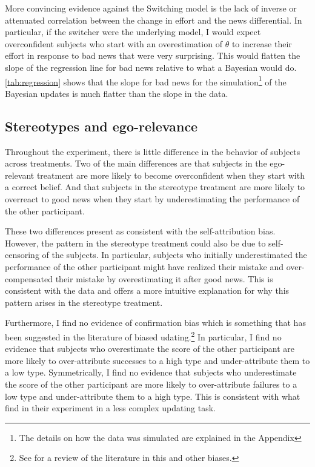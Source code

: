 \documentclass[
  12pt,
]{article}
\begin{document}
More convincing evidence against the Switching model is the lack of
inverse or attenuated correlation between the change in effort and the
news differential. In particular, if the switcher were the underlying
model, I would expect overconfident subjects who start with an
overestimation of \(\theta\) to increase their effort in response to bad
news that were very surprising. This would flatten the slope of the
regression line for bad news relative to what a Bayesian would do.
\ref{tab:regression} shows that the slope for bad news for the
simulation\footnote{The details on how the data was simulated are explained in the Appendix}
of the Bayesian updates is much flatter than the slope in the data.

\hypertarget{stereotypes-and-ego-relevance}{%
\subsection{Stereotypes and
ego-relevance}\label{stereotypes-and-ego-relevance}}

Throughout the experiment, there is little difference in the behavior of
subjects across treatments. Two of the main differences are that
subjects in the ego-relevant treatment are more likely to become
overconfident when they start with a correct belief. And that subjects
in the stereotype treatment are more likely to overreact to good news
when they start by underestimating the performance of the other
participant.

These two differences present as consistent with the self-attribution
bias. However, the pattern in the stereotype treatment could also be due
to self-censoring of the subjects. In particular, subjects who initially
underestimated the performance of the other participant might have
realized their mistake and over-compensated their mistake by
overestimating it after good news. This is consistent with the data and
offers a more intuitive explanation for why this pattern arises in the
stereotype treatment.

Furthermore, I find no evidence of confirmation bias which is something
that has been suggested in the literature of biased
udating.\footnote{See \citet{benjamin2019} for a review of the literature in this and 
other biases.} In particular, I find no evidence that subjects who
overestimate the score of the other participant are more likely to
over-attribute successes to a high type and under-attribute them to a
low type. Symmetrically, I find no evidence that subjects who
underestimate the score of the other participant are more likely to
over-attribute failures to a low type and under-attribute them to a high
type. This is consistent with what \citet{Mobius2022} find in their
experiment in a less complex updating task.
\end{document}
